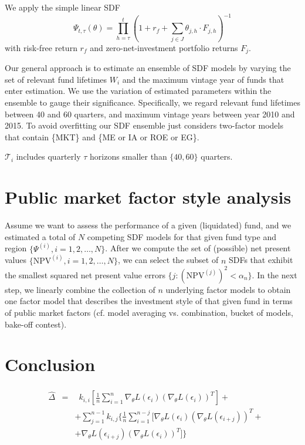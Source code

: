 \documentclass[12pt]{article}
\begin{document}
We apply the simple linear SDF
\begin{equation}
\label{eq:SDF}
\Psi_{t,\tau} (\theta) = \prod_{h=\tau}^{t} \left( 1 + r_f + \sum_{j \in J} \theta_{j,h} \cdot F_{j,h} \right)^{-1}
\end{equation}
with risk-free return $r_f$ and zero-net-investment portfolio returns $F_j$.

Our general approach is to estimate an ensemble of SDF models by varying the set of relevant fund lifetimes $W_{i}$ and the maximum vintage year of funds that enter estimation.
We use the variation of estimated parameters within the ensemble to gauge their significance.
Specifically, we regard relevant fund lifetimes between 40 and 60 quarters, and maximum vintage years between year 2010 and 2015.
To avoid overfitting our SDF ensemble just considers two-factor models that contain \{MKT\} and \{ME or IA or ROE or EG\}.

$\mathcal{T}_i$ includes quarterly $\tau$ horizons smaller than $\{40, 60\}$ quarters.


\section{Public market factor style analysis}

Assume we want to assess the performance of a given (liquidated) fund, and we estimated a total of $N$ competing SDF models for that given fund type and region $\{ \Psi^{(i)}, i=1,2,\dots,N \}$.
After we compute the set of (possible) net present values $\{ \mathrm{NPV}^{(i)}, i=1,2,\dots,N \}$, we can select the subset of $n$ SDFs that exhibit the smallest squared net present value errors $\{ j: (\mathrm{NPV}^{(j)})^2 < \alpha_n \}$.
In the next step, we linearly combine the collection of $n$ underlying factor models to obtain one factor model that describes the investment style of that given fund in terms of public market factors (cf. model averaging vs. combination, bucket of models, bake-off contest).


\section{Conclusion}

\begin{align}
\begin{aligned}
&\hat{\Delta} & = &
\enspace k_{i,i}
\left[
\frac{1}{n}
\sum_{i=1}^n
\nabla_{\theta} L \left( \epsilon_i \right)
\left(
\nabla_{\theta} L \left( \epsilon_i \right)
\right)^T
\right]  + \\
& &  & +
\sum_{j=1}^{n-1}
k_{i,j}
\{
\frac{1}{n}
\sum_{i=1}^{n-j}
[
\nabla_{\theta} L \left( \epsilon_i \right)
\left(
\nabla_{\theta} L \left( \epsilon_{i+j} \right)
\right)^T + \\
& &  & +
\nabla_{\theta} L \left( \epsilon_{i+j} \right)
\left(
\nabla_{\theta} L \left( \epsilon_i \right)
\right)^T
]
\}
\end{aligned}
\end{align}
\end{document}
